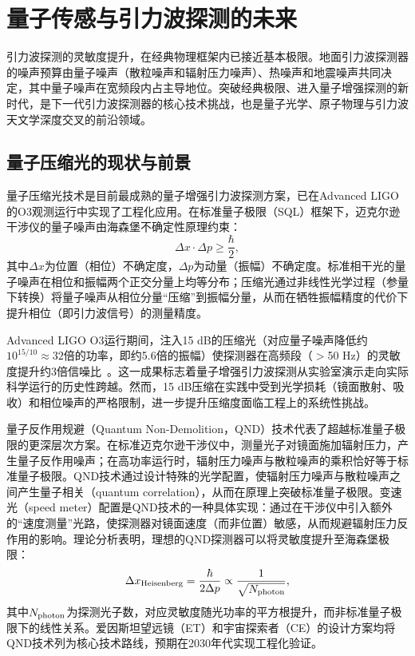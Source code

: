 \section{量子传感与引力波探测的未来}

引力波探测的灵敏度提升，在经典物理框架内已接近基本极限。地面引力波探测器的噪声预算由量子噪声（散粒噪声和辐射压力噪声）、热噪声和地震噪声共同决定，其中量子噪声在宽频段内占主导地位。突破经典极限、进入量子增强探测的新时代，是下一代引力波探测器的核心技术挑战，也是量子光学、原子物理与引力波天文学深度交叉的前沿领域。

\subsection{量子压缩光的现状与前景}

量子压缩光技术是目前最成熟的量子增强引力波探测方案，已在Advanced LIGO的O3观测运行中实现了工程化应用。在标准量子极限（SQL）框架下，迈克尔逊干涉仪的量子噪声由海森堡不确定性原理约束：
\begin{equation}
\Delta x \cdot \Delta p \geq \frac{\hbar}{2},
\end{equation}
其中$\Delta x$为位置（相位）不确定度，$\Delta p$为动量（振幅）不确定度。标准相干光的量子噪声在相位和振幅两个正交分量上均等分布；压缩光通过非线性光学过程（参量下转换）将量子噪声从相位分量“压缩”到振幅分量，从而在牺牲振幅精度的代价下提升相位（即引力波信号）的测量精度。

Advanced LIGO O3运行期间，注入15 dB的压缩光（对应量子噪声降低约$10^{15/10}\approx32$倍的功率，即约5.6倍的振幅）使探测器在高频段（$>$50 Hz）的灵敏度提升约3倍信噪比~\cite{Tse2019squeezing}。这一成果标志着量子增强引力波探测从实验室演示走向实际科学运行的历史性跨越。然而，15 dB压缩在实践中受到光学损耗（镜面散射、吸收）和相位噪声的严格限制，进一步提升压缩度面临工程上的系统性挑战。

量子反作用规避（Quantum Non-Demolition，QND）技术代表了超越标准量子极限的更深层次方案。在标准迈克尔逊干涉仪中，测量光子对镜面施加辐射压力，产生量子反作用噪声；在高功率运行时，辐射压力噪声与散粒噪声的乘积恰好等于标准量子极限。QND技术通过设计特殊的光学配置，使辐射压力噪声与散粒噪声之间产生量子相关（quantum correlation），从而在原理上突破标准量子极限。变速光（speed meter）配置是QND技术的一种具体实现：通过在干涉仪中引入额外的“速度测量”光路，使探测器对镜面速度（而非位置）敏感，从而规避辐射压力反作用的影响。理论分析表明，理想的QND探测器可以将灵敏度提升至海森堡极限：
\begin{equation}
\Delta x_{\rm Heisenberg} = \frac{\hbar}{2\Delta p} \propto \frac{1}{\sqrt{N_{\rm photon}}},
\end{equation}
其中$N_{\rm photon}$为探测光子数，对应灵敏度随光功率的平方根提升，而非标准量子极限下的线性关系。爱因斯坦望远镜（ET）和宇宙探索者（CE）的设计方案均将QND技术列为核心技术路线，预期在2030年代实现工程化验证。

